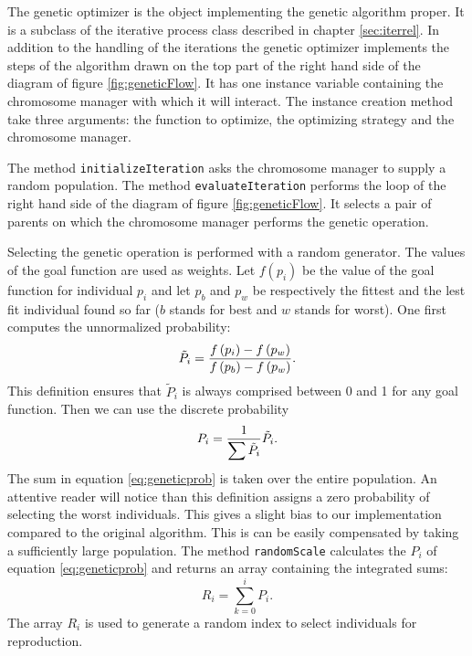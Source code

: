 \documentclass[twoside]{book}
\begin{document}
The genetic optimizer is the object implementing the genetic
algorithm proper. It is a subclass of the iterative process class
described in chapter \ref{sec:iterrel}. In addition to the
handling of the iterations the genetic optimizer implements the
steps of the algorithm drawn on the top part of the right hand
side of the diagram of figure \ref{fig:geneticFlow}. It has one
instance variable containing the chromosome manager with which it
will interact. The instance creation method take three arguments:
the function to optimize, the optimizing strategy and the
chromosome manager.

The method {\tt initializeIteration} asks the chromosome manager
to supply a random population. The method {\tt evaluateIteration}
performs the loop of the right hand side of the diagram of figure
\ref{fig:geneticFlow}. It selects a pair of parents on which the
chromosome manager performs the genetic operation.

Selecting the genetic operation is performed with a random
generator. The values of the goal function are used as weights.
Let $f\left(p_i\right)$ be the value of the goal function for
individual $p_i$ and let $p_b$ and $p_w$ be respectively the
fittest and the lest fit individual found so far ($b$ stands for
best and $w$ stands for worst). One first computes the
unnormalized probability:
\begin{equation}
  \tilde{P}_i={\displaystyle f\left(p_i\right) - f\left(p_w\right)
  \over\displaystyle f\left(p_b\right) - f\left(p_w\right)}.
\end{equation}
This definition ensures that $\tilde{P}_i$ is always comprised
between 0 and 1 for any goal function. Then we can use the
discrete probability
\begin{equation}
\label{eq:geneticprob}
  P_i={\displaystyle  1
  \over\displaystyle \sum\tilde{P}_i} \tilde{P}_i.
\end{equation}
The sum in equation \ref{eq:geneticprob} is taken over the entire
population. An attentive reader will notice than this definition
assigns a zero probability of selecting the worst individuals.
This gives a slight bias to our implementation compared to the
original algorithm. This is can be easily compensated by taking a
sufficiently large population. The method {\tt randomScale}
calculates the $P_i$ of equation \ref{eq:geneticprob} and returns
an array containing the integrated sums:
\begin{equation}
  R_i=\sum_{k=0}^i P_i.
\end{equation}
The array $R_i$ is used to generate a random index to select
individuals for reproduction.
\end{document}
